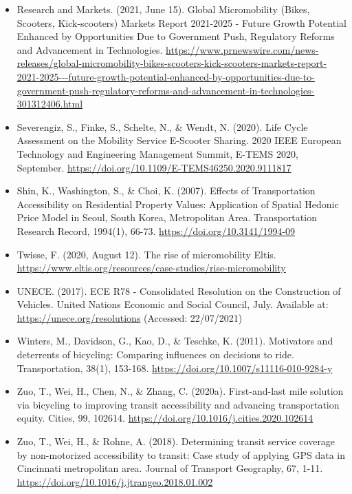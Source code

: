 \documentclass[
]{book}
\begin{document}
\begin{itemize}
\item
  Research and Markets. (2021, June 15). Global Micromobility (Bikes, Scooters, Kick-scooters) Markets Report 2021-2025 - Future Growth Potential Enhanced by Opportunities Due to Government Push, Regulatory Reforms and Advancement in Technologies. \url{https://www.prnewswire.com/news-releases/global-micromobility-bikes-scooters-kick-scooters-markets-report-2021-2025---future-growth-potential-enhanced-by-opportunities-due-to-government-push-regulatory-reforms-and-advancement-in-technologies-301312406.html}
\item
  Severengiz, S., Finke, S., Schelte, N., \& Wendt, N. (2020). Life Cycle Assessment on the Mobility Service E-Scooter Sharing. 2020 IEEE European Technology and Engineering Management Summit, E-TEMS 2020, September. \url{https://doi.org/10.1109/E-TEMS46250.2020.9111817}
\item
  Shin, K., Washington, S., \& Choi, K. (2007). Effects of Transportation Accessibility on Residential Property Values: Application of Spatial Hedonic Price Model in Seoul, South Korea, Metropolitan Area. Transportation Research Record, 1994(1), 66-73. \url{https://doi.org/10.3141/1994-09}
\item
  Twisse, F. (2020, August 12). The rise of micromobility \textbar{} Eltis. \url{https://www.eltis.org/resources/case-studies/rise-micromobility}
\item
  UNECE. (2017). ECE R78 - Consolidated Resolution on the Construction of Vehicles. United Nations Economic and Social Council, July. Available at: \url{https://unece.org/resolutions} (Accessed: 22/07/2021)
\item
  Winters, M., Davidson, G., Kao, D., \& Teschke, K. (2011). Motivators and deterrents of bicycling: Comparing influences on decisions to ride. Transportation, 38(1), 153-168. \url{https://doi.org/10.1007/s11116-010-9284-y}
\item
  Zuo, T., Wei, H., Chen, N., \& Zhang, C. (2020a). First-and-last mile solution via bicycling to improving transit accessibility and advancing transportation equity. Cities, 99, 102614. \url{https://doi.org/10.1016/j.cities.2020.102614}
\item
  Zuo, T., Wei, H., \& Rohne, A. (2018). Determining transit service coverage by non-motorized accessibility to transit: Case study of applying GPS data in Cincinnati metropolitan area. Journal of Transport Geography, 67, 1-11. \url{https://doi.org/10.1016/j.jtrangeo.2018.01.002}
\end{itemize}
\end{document}
